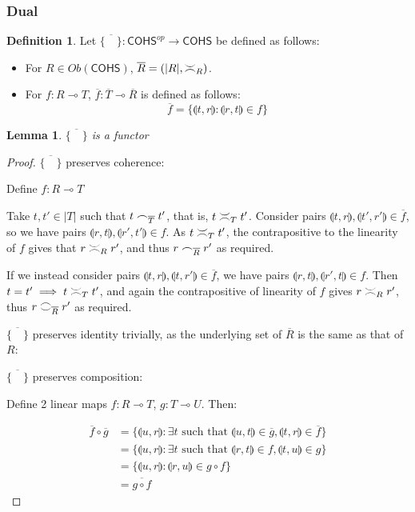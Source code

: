 \documentclass[11pt, oneside]{article}
\theoremstyle{plain}
\newtheorem{lemma}[theorem]{Lemma}
\theoremstyle{definition}
\newtheorem{definition}[theorem]{Definition}
\newcommand{\lp}{\llparenthesis}
\newcommand{\rp}{\rrparenthesis}
\newcommand{\cohs}{{\mathsf{COHS}}}
\newcommand{\coh}[1][]{\mathrel{\vcenter{\offinterlineskip\hbox{$\frown$}\vskip0.2ex\hbox{$\smile$}}_{\ifx\\#1\\\else#1\fi}}}
\newcommand{\incoh}[1][]{\mathrel{\vcenter{\offinterlineskip\hbox{$\smile$}\vskip0.2ex\hbox{$\frown$}}_{\ifx\\#1\\\else#1\fi}}}
\newcommand{\scoh}[1][]{\mathrel{\frown}_{\ifx\\#1\\\else#1\fi}}
\newcommand{\comp}{\mathbin{\circ}}
\begin{document}
\subsubsection{Dual}
\begin{definition}
    Let $\overline{\{\quad\}}:\cohs^{op}\to\cohs$ be defined as follows:
    \begin{itemize}
        \item
        For $R\in Ob(\cohs)$, $\overline{R}=(|R|,\incoh[R])$.

        \item
        For $f:R\multimap T$, $\overline{f}:\overline{T}\multimap\overline{R}$ is defined as follows:
        $$\overline{f}=\{\lp t,r\rp:\lp r,t\rp\in f\}$$
    \end{itemize}
\end{definition}

\begin{lemma}
    $\overline{\{\quad\}}$ is a functor
\end{lemma}

\begin{proof}

    $\overline{\{\quad\}}$ preserves coherence:
    \begin{adjustwidth}{1.5em}{}
        Define $f:R\multimap T$

        Take $t,t'\in|T|$ such that $t\scoh[\overline{T}]t'$, that is, $t\incoh[T]t'$.
        Consider pairs $\lp t,r\rp,\lp t',r'\rp\in\overline{f}$, so we have pairs $\lp r,t\rp,\lp r',t'\rp\in f$.
        As $t\incoh[T]t'$, the contrapositive to the linearity of $f$ gives that $r\incoh[R]r'$, and thus $r\scoh[\overline{R}]r'$ as required.

        If we instead consider pairs $\lp t,r\rp,\lp t,r'\rp\in\overline{f}$, we have pairs $\lp r,t\rp,\lp r',t\rp\in f$.
        Then $t=t'\implies t\incoh[T]t'$, and again the contrapositive of linearity of $f$ gives $r\incoh[R]r'$, thus $r\coh[\overline{R}]r'$ as required.

    \end{adjustwidth}

    $\overline{\{\quad\}}$ preserves identity trivially, as the underlying set of $\overline{R}$ is the same as that of $R$:

    $\overline{\{\quad\}}$ preserves composition:
    \begin{adjustwidth}{1.5em}{}
        Define 2 linear maps $f:R\multimap T$, $g:T\multimap U$. Then:
    \end{adjustwidth}
    \begin{align*}
        \overline{f}\comp\overline{g} &= \{\lp u,r\rp:\exists t \text{ such that } \lp u,t\rp\in \overline{g},\lp t,r\rp\in \overline{f}\} \\
        &= \{\lp u,r\rp:\exists t \text{ such that } \lp r,t\rp\in f,\lp t,u\rp\in g\} \\
        &= \{\lp u,r\rp:\lp r,u\rp\in g\comp f\} \\
        &= \overline{g\comp f}
    \end{align*}

\end{proof}
\end{document}
